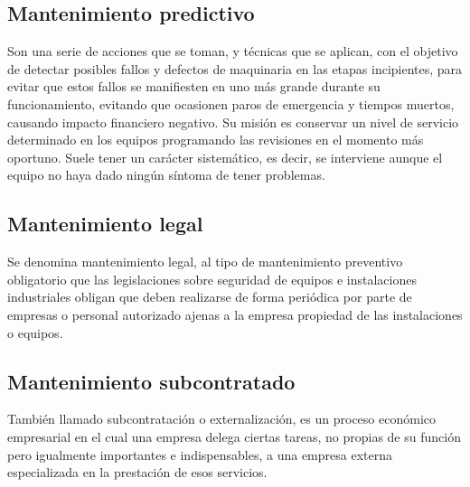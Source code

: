 \documentclass[../main]{subfiles}
\begin{document}
\subsection{Mantenimiento predictivo}
Son una serie de acciones que se toman, y técnicas que se aplican,
con el objetivo de detectar posibles fallos y defectos de maquinaria
en las etapas incipientes, para evitar que estos fallos se
manifiesten en uno más grande durante su funcionamiento, evitando que
ocasionen paros de emergencia y tiempos muertos, causando impacto
financiero negativo. Su misión es conservar un nivel de servicio
determinado en los equipos programando las revisiones en el momento
más oportuno. Suele tener un carácter sistemático, es decir, se
interviene aunque el equipo no haya dado ningún síntoma de tener problemas.

\subsection{Mantenimiento legal}

Se denomina mantenimiento legal, al tipo de mantenimiento preventivo
obligatorio que las legislaciones sobre seguridad de equipos e
instalaciones industriales obligan que deben realizarse de forma
periódica por parte de empresas o personal autorizado ajenas a la
empresa propiedad de las instalaciones o equipos.

\subsection{Mantenimiento subcontratado}
También llamado subcontratación o externalización, es un proceso
económico empresarial en el cual una empresa delega ciertas tareas,
no propias de su función pero igualmente importantes e
indispensables, a una empresa externa especializada en la prestación
de esos servicios.
\end{document}
